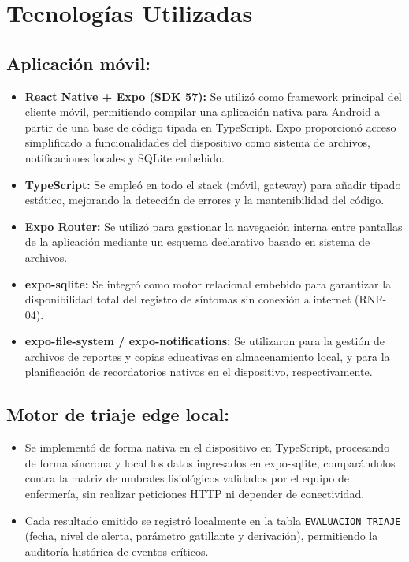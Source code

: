 \section{Tecnologías Utilizadas}

\subsection*{Aplicación móvil:}
\begin{itemize}
    \item \textbf{React Native + Expo (SDK 57):} Se utilizó como framework principal del cliente móvil, permitiendo compilar una aplicación nativa para Android a partir de una base de código tipada en TypeScript. Expo proporcionó acceso simplificado a funcionalidades del dispositivo como sistema de archivos, notificaciones locales y SQLite embebido.
    \item \textbf{TypeScript:} Se empleó en todo el stack (móvil, gateway) para añadir tipado estático, mejorando la detección de errores y la mantenibilidad del código.
    \item \textbf{Expo Router:} Se utilizó para gestionar la navegación interna entre pantallas de la aplicación mediante un esquema declarativo basado en sistema de archivos.
    \item \textbf{expo-sqlite:} Se integró como motor relacional embebido para garantizar la disponibilidad total del registro de síntomas sin conexión a internet (RNF-04).
    \item \textbf{expo-file-system / expo-notifications:} Se utilizaron para la gestión de archivos de reportes y copias educativas en almacenamiento local, y para la planificación de recordatorios nativos en el dispositivo, respectivamente.
\end{itemize}

\subsection*{Motor de triaje edge local:}
\begin{itemize}
    \item Se implementó de forma nativa en el dispositivo en TypeScript, procesando de forma síncrona y local los datos ingresados en expo-sqlite, comparándolos contra la matriz de umbrales fisiológicos validados por el equipo de enfermería, sin realizar peticiones HTTP ni depender de conectividad.
    \item Cada resultado emitido se registró localmente en la tabla \texttt{EVALUACION\_TRIAJE} (fecha, nivel de alerta, parámetro gatillante y derivación), permitiendo la auditoría histórica de eventos críticos.
\end{itemize}

